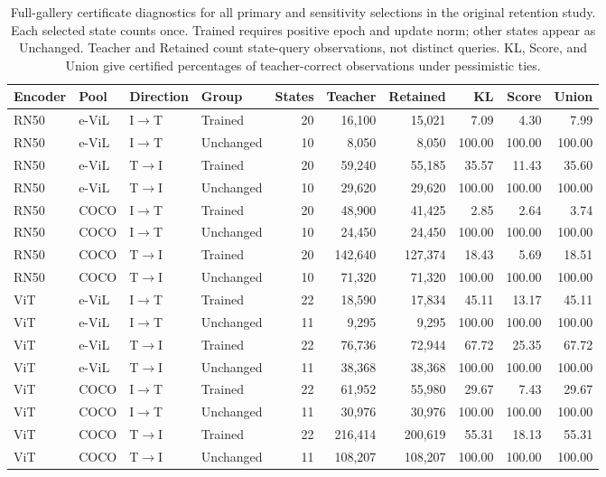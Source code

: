 \begin{table}[t]
\centering
\scriptsize
\setlength{\tabcolsep}{3pt}
\begin{tabular}{llllrrrrrr}
\toprule
Encoder & Pool & Direction & Group & States & Teacher & Retained & KL & Score & Union\\
\midrule
RN50 & e-ViL & I$\to$T & Trained & 20 & 16,100 & 15,021 & 7.09 & 4.30 & 7.99\\
RN50 & e-ViL & I$\to$T & Unchanged & 10 & 8,050 & 8,050 & 100.00 & 100.00 & 100.00\\
RN50 & e-ViL & T$\to$I & Trained & 20 & 59,240 & 55,185 & 35.57 & 11.43 & 35.60\\
RN50 & e-ViL & T$\to$I & Unchanged & 10 & 29,620 & 29,620 & 100.00 & 100.00 & 100.00\\
RN50 & COCO & I$\to$T & Trained & 20 & 48,900 & 41,425 & 2.85 & 2.64 & 3.74\\
RN50 & COCO & I$\to$T & Unchanged & 10 & 24,450 & 24,450 & 100.00 & 100.00 & 100.00\\
RN50 & COCO & T$\to$I & Trained & 20 & 142,640 & 127,374 & 18.43 & 5.69 & 18.51\\
RN50 & COCO & T$\to$I & Unchanged & 10 & 71,320 & 71,320 & 100.00 & 100.00 & 100.00\\
ViT & e-ViL & I$\to$T & Trained & 22 & 18,590 & 17,834 & 45.11 & 13.17 & 45.11\\
ViT & e-ViL & I$\to$T & Unchanged & 11 & 9,295 & 9,295 & 100.00 & 100.00 & 100.00\\
ViT & e-ViL & T$\to$I & Trained & 22 & 76,736 & 72,944 & 67.72 & 25.35 & 67.72\\
ViT & e-ViL & T$\to$I & Unchanged & 11 & 38,368 & 38,368 & 100.00 & 100.00 & 100.00\\
ViT & COCO & I$\to$T & Trained & 22 & 61,952 & 55,980 & 29.67 & 7.43 & 29.67\\
ViT & COCO & I$\to$T & Unchanged & 11 & 30,976 & 30,976 & 100.00 & 100.00 & 100.00\\
ViT & COCO & T$\to$I & Trained & 22 & 216,414 & 200,619 & 55.31 & 18.13 & 55.31\\
ViT & COCO & T$\to$I & Unchanged & 11 & 108,207 & 108,207 & 100.00 & 100.00 & 100.00\\
\bottomrule
\end{tabular}
\caption{Full-gallery certificate diagnostics for all primary and sensitivity selections in the original retention study. Each selected state counts once. Trained requires positive epoch and update norm; other states appear as Unchanged. Teacher and Retained count state-query observations, not distinct queries. KL, Score, and Union give certified percentages of teacher-correct observations under pessimistic ties.}\label{tab:certificates}
\end{table}

